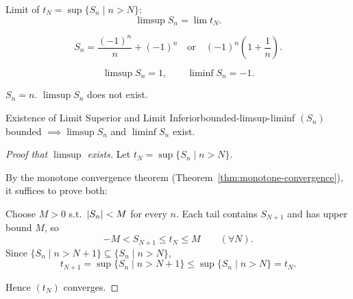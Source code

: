 \begin{thinking}[Intuition]
  Limit of $t_N=\sup\{S_n\mid n>N\}$:
  \[
    \limsup S_n=\lim t_N.
  \]
\end{thinking}

\begin{example}
  \[
    S_n=\frac{(-1)^n}{n}+(-1)^n
    \quad\text{or}\quad (-1)^n\left(1+\frac1n\right).
  \]
  \begin{center}
  \end{center}
  \[
    \limsup S_n=1,\qquad\liminf S_n=-1.
  \]
\end{example}

\begin{example}
  $S_n=n$. $\limsup S_n$ does not exist.
\end{example}

\begin{theorem}{Existence of Limit Superior and Limit Inferior}{bounded-limsup-liminf}
  $(S_n)$ bounded $\implies\limsup S_n$ and $\liminf S_n$ exist.
\end{theorem}

\begin{proof}[Proof that $\limsup$ exists]
  Let $t_N=\sup\{S_n\mid n>N\}$.

  By the monotone convergence theorem (Theorem~\ref{thm:monotone-convergence}),
  it suffices to prove both:
  \begin{enumerate}[proofsubgoals]
    Choose $M>0$ s.t.\ $\left\lvert S_n \right\rvert<M$ for every $n$.
    Each tail contains $S_{N+1}$ and has upper bound $M$, so
    \[
      -M<S_{N+1}\le t_N\le M \qquad(\forall N).
    \]
    Since $\{S_n\mid n>N+1\}\subseteq\{S_n\mid n>N\}$,
    \[
      t_{N+1}=\sup\{S_n\mid n>N+1\}\le\sup\{S_n\mid n>N\}=t_N.
    \]
  \end{enumerate}
  Hence $(t_N)$ converges.
\end{proof}

